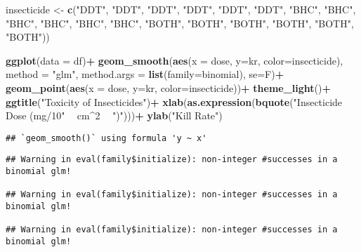 \documentclass[
]{article}
\newenvironment{Shaded}{\begin{snugshade}}{\end{snugshade}}
\newcommand{\DataTypeTok}[1]{\textcolor[rgb]{0.13,0.29,0.53}{#1}}
\newcommand{\DecValTok}[1]{\textcolor[rgb]{0.00,0.00,0.81}{#1}}
\newcommand{\KeywordTok}[1]{\textcolor[rgb]{0.13,0.29,0.53}{\textbf{#1}}}
\newcommand{\NormalTok}[1]{#1}
\newcommand{\OperatorTok}[1]{\textcolor[rgb]{0.81,0.36,0.00}{\textbf{#1}}}
\newcommand{\StringTok}[1]{\textcolor[rgb]{0.31,0.60,0.02}{#1}}
\begin{document}
\begin{Shaded}
\begin{Highlighting}[]
\NormalTok{  insecticide <-}\StringTok{ }\KeywordTok{c}\NormalTok{(}\StringTok{"DDT"}\NormalTok{, }\StringTok{"DDT"}\NormalTok{, }\StringTok{"DDT"}\NormalTok{, }\StringTok{"DDT"}\NormalTok{, }\StringTok{"DDT"}\NormalTok{, }\StringTok{"DDT"}\NormalTok{, }\StringTok{"BHC"}\NormalTok{, }\StringTok{"BHC"}\NormalTok{, }\StringTok{"BHC"}\NormalTok{, }\StringTok{"BHC"}\NormalTok{, }\StringTok{"BHC"}\NormalTok{, }\StringTok{"BHC"}\NormalTok{, }\StringTok{"BOTH"}\NormalTok{, }\StringTok{"BOTH"}\NormalTok{, }\StringTok{"BOTH"}\NormalTok{, }\StringTok{"BOTH"}\NormalTok{, }\StringTok{"BOTH"}\NormalTok{, }\StringTok{"BOTH"}\NormalTok{))}

\KeywordTok{ggplot}\NormalTok{(}\DataTypeTok{data =}\NormalTok{ df)}\OperatorTok{+}
\StringTok{  }\KeywordTok{geom_smooth}\NormalTok{(}\KeywordTok{aes}\NormalTok{(}\DataTypeTok{x =}\NormalTok{ dose, }\DataTypeTok{y=}\NormalTok{kr, }\DataTypeTok{color=}\NormalTok{insecticide), }\DataTypeTok{method =} \StringTok{"glm"}\NormalTok{, }\DataTypeTok{method.args =} \KeywordTok{list}\NormalTok{(}\DataTypeTok{family=}\NormalTok{binomial), }\DataTypeTok{se=}\NormalTok{F)}\OperatorTok{+}
\StringTok{  }\KeywordTok{geom_point}\NormalTok{(}\KeywordTok{aes}\NormalTok{(}\DataTypeTok{x =}\NormalTok{ dose, }\DataTypeTok{y=}\NormalTok{kr, }\DataTypeTok{color=}\NormalTok{insecticide))}\OperatorTok{+}
\StringTok{  }\KeywordTok{theme_light}\NormalTok{()}\OperatorTok{+}
\StringTok{  }\KeywordTok{ggtitle}\NormalTok{(}\StringTok{"Toxicity of Insecticides"}\NormalTok{)}\OperatorTok{+}
\StringTok{  }\KeywordTok{xlab}\NormalTok{(}\KeywordTok{as.expression}\NormalTok{(}\KeywordTok{bquote}\NormalTok{(}\StringTok{"Insecticide Dose (mg/10"} \OperatorTok{~}\StringTok{ }\NormalTok{cm}\OperatorTok{^}\DecValTok{2} \OperatorTok{~}\StringTok{ ")"}\NormalTok{)))}\OperatorTok{+}
\StringTok{  }\KeywordTok{ylab}\NormalTok{(}\StringTok{"Kill Rate"}\NormalTok{)}
\end{Highlighting}
\end{Shaded}

\begin{verbatim}
## `geom_smooth()` using formula 'y ~ x'
\end{verbatim}

\begin{verbatim}
## Warning in eval(family$initialize): non-integer #successes in a binomial glm!

## Warning in eval(family$initialize): non-integer #successes in a binomial glm!

## Warning in eval(family$initialize): non-integer #successes in a binomial glm!
\end{verbatim}
\end{document}
